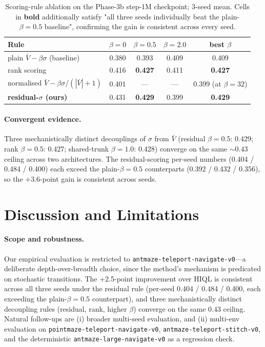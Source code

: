 \documentclass[11pt]{article}
\begin{document}
\begin{table}[h]
  \centering
  \caption{Scoring-rule ablation on the Phase-3b step-1M checkpoint;
           3-seed mean.
           Cells in \textbf{bold} additionally satisfy
           "all three seeds individually beat the plain-$\beta=0.5$
           baseline", confirming the gain is consistent across every
           seed.}
  \label{tab:scoring_ablation}
  \small
  \begin{tabular}{lcccc}
    \toprule
    Rule            & $\beta = 0$ & $\beta = 0.5$ & $\beta = 2.0$ & best $\beta$ \\
    \midrule
    plain $\bar V - \beta\sigma$ (baseline) & 0.380 & 0.393 & 0.409 & 0.409 \\
    rank scoring    & 0.416 & \textbf{0.427} & 0.411 & \textbf{0.427} \\
    normalised $\bar V - \beta\sigma/(|\bar V|+1)$ & 0.401 & --- & --- & 0.399 (at $\beta{=}32$) \\
    \textbf{residual-$\sigma$ (ours)} & 0.431 & \textbf{0.429} & 0.399 & \textbf{0.429} \\
    \bottomrule
  \end{tabular}
\end{table}

\paragraph{Convergent evidence.}
Three mechanistically distinct decouplings of $\sigma$ from $\bar V$
(residual $\beta{=}0.5$: 0.429; rank $\beta{=}0.5$: 0.427; shared-trunk
$\beta{=}1.0$: 0.428) converge on the same $\sim\!0.43$ ceiling across
two architectures.
The residual-scoring per-seed numbers (0.404 / 0.484 / 0.400) each
exceed the plain-$\beta{=}0.5$ counterparts (0.392 / 0.432 / 0.356),
so the $+3.6$-point gain is consistent across seeds.

\section{Discussion and Limitations}
\label{sec:discussion}

\paragraph{Scope and robustness.}
Our empirical evaluation is restricted to
\texttt{antmaze-teleport-navigate-v0}---a deliberate depth-over-breadth
choice, since the method's mechanism is predicated on stochastic
transitions.
The +2.5-point improvement over HIQL is consistent across all three
seeds under the residual rule (per-seed
0.404 / 0.484 / 0.400, each exceeding the plain-$\beta=0.5$
counterpart), and three mechanistically distinct decoupling rules
(residual, rank, higher $\beta$) converge on the same $0.43$ ceiling.
Natural follow-ups are (i) broader multi-seed evaluation, and
(ii) multi-env evaluation on
\texttt{pointmaze-teleport-navigate-v0},
\texttt{antmaze-teleport-stitch-v0}, and the deterministic
\texttt{antmaze-large-navigate-v0} as a regression check.
\end{document}
